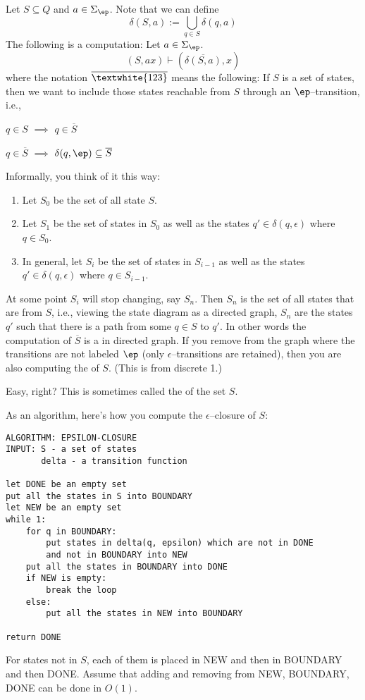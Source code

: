 \newpage
\begin{defn}
Let $S \subseteq Q$ and $a \in \Sigma_\ep$. Note that we can
define
\[
 \delta(S,a) := \bigcup_{q \in S} \delta(q,a)
\]
The following is a computation: Let $a \in \Sigma_\ep$.
\[ (S,ax) \vdash (\overline{\delta(S,a)}, x) \]
where the notation $\overline{\textwhite{123}}$ means the following: If $S$ is a
set of states, then we want to include those states reachable from
$S$ through an $\ep$--transition, i.e.,
 \begin{tightlist}
  \item $q \in S$ $\implies$ $q \in \overline{S}$
  \item $q \in \overline{S}$ $\implies$ $\delta(q,\ep) \subseteq
  \overline{S}$
 \end{tightlist}
\end{defn}
Informally, you think of it this way:
\begin{enumerate}
\item Let $S_0$ be the set of all
  state $S$.
\item
  Let $S_1$ be the set of states in $S_0$
  as well as the states $q' \in \delta(q, \epsilon)$
  where $q \in S_0$.
\item
  In general,
  let $S_i$ be the set of states in $S_{i-1}$
  as well as the states $q' \in \delta(q, \epsilon)$
  where $q \in S_{i-1}$.
\end{enumerate}
At some point $S_i$ will stop changing, say $S_n$.
Then $S_n$ is the set of all states that are
 from $S$, i.e.,
viewing the state diagram as a directed graph,
$S_n$ are the states $q'$ such that there is a path
from some $q \in S$ to $q'$.
In other words the computation of $\overline{S}$ is a
 in directed graph.
If you remove from the graph where the transitions are
not labeled $\ep$ (only $\epsilon$--transitions are retained), then you are
also computing the  of $S$.
(This is from discrete 1.)

Easy, right?
This is sometimes called the  of the
set $S$.

As an algorithm, here's how you compute the $\epsilon$--closure of $S$:
\begin{Verbatim}[frame=single, fontsize=\small]
ALGORITHM: EPSILON-CLOSURE
INPUT: S - a set of states
       delta - a transition function

let DONE be an empty set
put all the states in S into BOUNDARY
let NEW be an empty set       
while 1:
    for q in BOUNDARY:
        put states in delta(q, epsilon) which are not in DONE
        and not in BOUNDARY into NEW
    put all the states in BOUNDARY into DONE
    if NEW is empty:
        break the loop
    else:
        put all the states in NEW into BOUNDARY

return DONE
\end{Verbatim}
For states not in $S$, each of them is placed in NEW and then in
BOUNDARY and then DONE.
Assume that adding and removing from NEW, BOUNDARY, DONE
can be done in $O(1)$.


